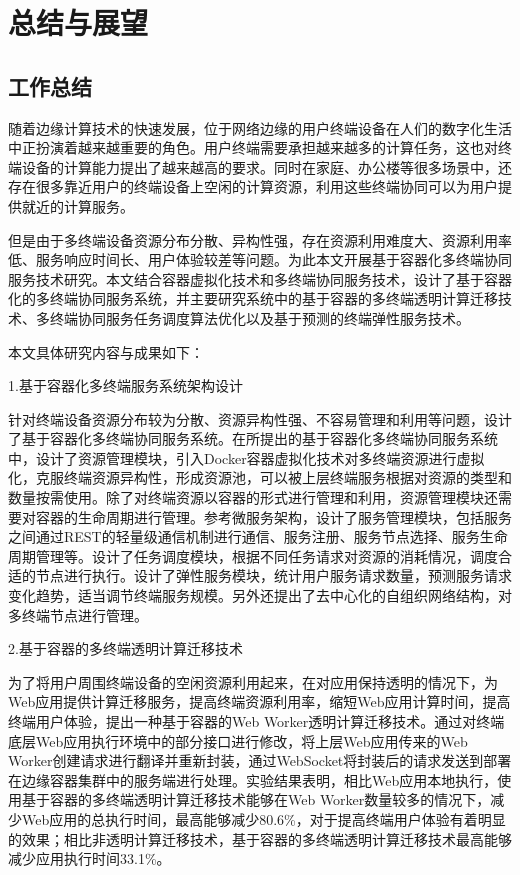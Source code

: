 \chapter{总结与展望 }\label{chap:summary_and_future_work}

\section{工作总结}

随着边缘计算技术的快速发展，位于网络边缘的用户终端设备在人们的数字化生活中正扮演着越来越重要的角色。用户终端需要承担越来越多的计算任务，这也对终端设备的计算能力提出了越来越高的要求。同时在家庭、办公楼等很多场景中，还存在很多靠近用户的终端设备上空闲的计算资源，利用这些终端协同可以为用户提供就近的计算服务。

但是由于多终端设备资源分布分散、异构性强，存在资源利用难度大、资源利用率低、服务响应时间长、用户体验较差等问题。为此本文开展基于容器化多终端协同服务技术研究。本文结合容器虚拟化技术和多终端协同服务技术，设计了基于容器化的多终端协同服务系统，并主要研究系统中的基于容器的多终端透明计算迁移技术、多终端协同服务任务调度算法优化以及基于预测的终端弹性服务技术。

本文具体研究内容与成果如下：

1.基于容器化多终端服务系统架构设计

针对终端设备资源分布较为分散、资源异构性强、不容易管理和利用等问题，设计了基于容器化多终端协同服务系统。在所提出的基于容器化多终端协同服务系统中，设计了资源管理模块，引入Docker容器虚拟化技术对多终端资源进行虚拟化，克服终端资源异构性，形成资源池，可以被上层终端服务根据对资源的类型和数量按需使用。除了对终端资源以容器的形式进行管理和利用，资源管理模块还需要对容器的生命周期进行管理。参考微服务架构，设计了服务管理模块，包括服务之间通过REST的轻量级通信机制进行通信、服务注册、服务节点选择、服务生命周期管理等。设计了任务调度模块，根据不同任务请求对资源的消耗情况，调度合适的节点进行执行。设计了弹性服务模块，统计用户服务请求数量，预测服务请求变化趋势，适当调节终端服务规模。另外还提出了去中心化的自组织网络结构，对多终端节点进行管理。

2.基于容器的多终端透明计算迁移技术

为了将用户周围终端设备的空闲资源利用起来，在对应用保持透明的情况下，为Web应用提供计算迁移服务，提高终端资源利用率，缩短Web应用计算时间，提高终端用户体验，提出一种基于容器的Web Worker透明计算迁移技术。通过对终端底层Web应用执行环境中的部分接口进行修改，将上层Web应用传来的Web Worker创建请求进行翻译并重新封装，通过WebSocket将封装后的请求发送到部署在边缘容器集群中的服务端进行处理。实验结果表明，相比Web应用本地执行，使用基于容器的多终端透明计算迁移技术能够在Web Worker数量较多的情况下，减少Web应用的总执行时间，最高能够减少80.6\%，对于提高终端用户体验有着明显的效果；相比非透明计算迁移技术，基于容器的多终端透明计算迁移技术最高能够减少应用执行时间33.1\%。

